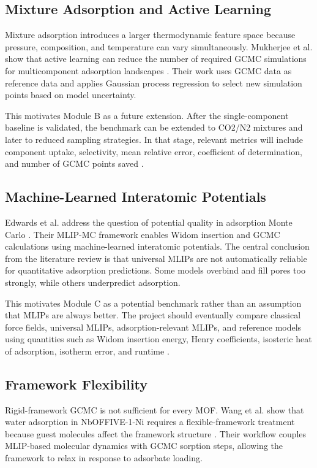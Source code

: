 \subsection{Mixture Adsorption and Active Learning}

Mixture adsorption introduces a larger thermodynamic feature space because pressure, composition, and temperature can vary simultaneously.
Mukherjee et al. show that active learning can reduce the number of required GCMC simulations for multicomponent adsorption landscapes \cite{mukherjee2023active}.
Their work uses GCMC data as reference data and applies Gaussian process regression to select new simulation points based on model uncertainty.

This motivates Module B as a future extension.
After the single-component baseline is validated, the benchmark can be extended to CO2/N2 mixtures and later to reduced sampling strategies.
In that stage, relevant metrics will include component uptake, selectivity, mean relative error, coefficient of determination, and number of GCMC points saved \cite{tao2022gcmc,mukherjee2023active}.

\subsection{Machine-Learned Interatomic Potentials}

Edwards et al. address the question of potential quality in adsorption Monte Carlo \cite{edwards2026mlipmc}.
Their MLIP-MC framework enables Widom insertion and GCMC calculations using machine-learned interatomic potentials.
The central conclusion from the literature review is that universal MLIPs are not automatically reliable for quantitative adsorption predictions.
Some models overbind and fill pores too strongly, while others underpredict adsorption.

This motivates Module C as a potential benchmark rather than an assumption that MLIPs are always better.
The project should eventually compare classical force fields, universal MLIPs, adsorption-relevant MLIPs, and reference models using quantities such as Widom insertion energy, Henry coefficients, isosteric heat of adsorption, isotherm error, and runtime \cite{edwards2026mlipmc}.

\subsection{Framework Flexibility}

Rigid-framework GCMC is not sufficient for every MOF.
Wang et al. show that water adsorption in NbOFFIVE-1-Ni requires a flexible-framework treatment because guest molecules affect the framework structure \cite{wang2026flexible}.
Their workflow couples MLIP-based molecular dynamics with GCMC sorption steps, allowing the framework to relax in response to adsorbate loading.

